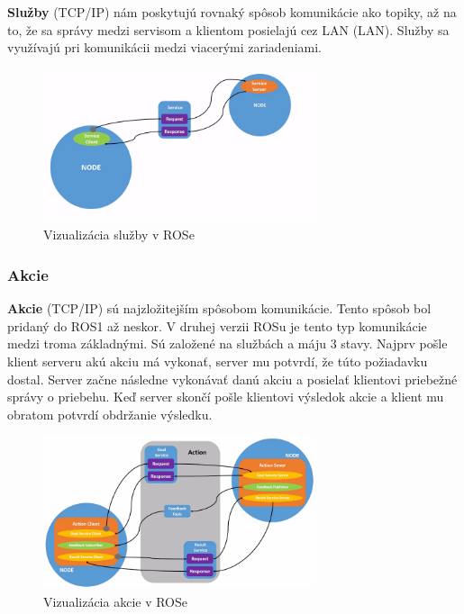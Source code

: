 \textbf {Služby} (TCP/IP) nám poskytujú rovnaký spôsob komunikácie ako topiky, až na to, že sa správy medzi servisom a klientom posielajú
cez LAN (\acrlong{LAN}). Služby sa využívajú pri komunikácii medzi viacerými zariadeniami.

\begin{figure}[h]
	\centering
	\includegraphics[width=8cm]{img/serviceExplanation.png}
	\caption{Vizualizácia služby v ROSe \cite{RosDoc}}
	\label{fig:service}
\end{figure}

\subsubsection{Akcie}

\label{s_action}
\textbf {Akcie} (TCP/IP) sú najzložitejším spôsobom komunikácie. Tento spôsob bol pridaný do ROS1 až neskor. V druhej verzii ROSu je tento
typ komunikácie medzi troma základnými. Sú založené na službách a máju 3 stavy. Najprv pošle klient serveru akú akciu má vykonať, server mu potvrdí,
že túto požiadavku dostal. Server začne následne vykonávať danú akciu a posielať klientovi priebežné správy o priebehu. Keď server skončí pošle
klientovi výsledok akcie a klient mu obratom potvrdí obdržanie výsledku.

\begin{figure}[h]
	\centering
	\includegraphics[width=8cm]{img/actionExplanation.png}
	\caption{Vizualizácia akcie v ROSe \cite{RosDoc}}
	\label{fig:action}
\end{figure}

